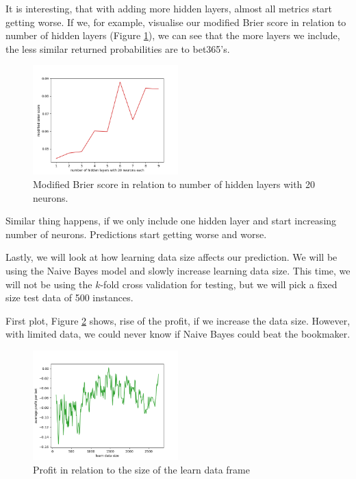 \documentclass[conference]{IEEEtran}
\begin{document}
It is interesting, that with adding more hidden layers, almost all metrics start getting worse.
If we, for example, visualise our modified Brier score in relation to number of hidden layers 
(Figure \ref{mbs-mlp}), we can see that the more layers we include, the less similar
returned probabilities are to bet365's.

\begin{figure}[!ht]
\includegraphics[width=0.5\textwidth]{mbs_layers_mlp.png}
\caption{Modified Brier score in relation to number of hidden layers with 20 neurons.}
\label{mbs-mlp}
\end{figure}

Similar thing happens, if we only include one hidden layer and start increasing number
of neurons. Predictions start getting worse and worse.

Lastly, we will look at how learning data size affects our prediction. We will be using the 
Naive Bayes model and slowly increase learning data size. This time, we will not be using 
the $k$-fold cross validation for testing, but we will pick a fixed size test data of 500
instances.

First plot, Figure \ref{data_size_profit} shows, rise of the profit, if we increase the data size. However, with limited data, we could never know if Naive Bayes could beat the bookmaker.

\begin{figure}[!ht]
\includegraphics[width=0.5\textwidth]{profit-data_size.png}
\caption{Profit in relation to the size of the learn data frame}
\label{data_size_profit}
\end{figure}
\end{document}
